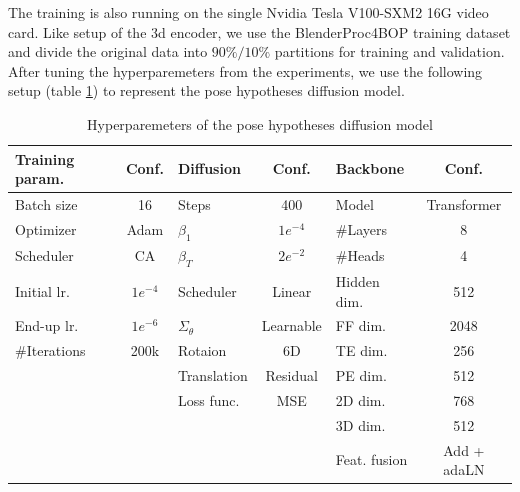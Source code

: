 \documentclass[12pt,DIV14,BCOR12mm,a4paper,footinclude=false,headinclude,parskip=half-,twoside,openright,cleardoublepage=empty,toc=index,bibliography=totoc,listof=totoc]{scrreprt}
\numberwithin{equation}{chapter}
\begin{document}
The training is also running on the single Nvidia Tesla V100-SXM2 16G video card. Like setup of the \gls{3d} encoder, we use the BlenderProc4BOP training dataset and divide the original data into $90\%/10\%$ partitions for training and validation. After tuning the hyperparemeters from the experiments, we use the following setup (table \ref{tab:hyper}) to represent the pose hypotheses diffusion model.
\begin{table}[h]
  \centering
  \caption{Hyperparemeters of the pose hypotheses diffusion model}
  \label{tab:hyper}
  \begin{tabular}{l c | l c | l c}
      \toprule
      Training param. & Conf. & Diffusion & Conf. & Backbone & Conf.\\
      \midrule
      Batch size & 16 & Steps & 400 & Model & Transformer\\
      Optimizer & Adam & $\beta_{1}$ & $1e^{-4}$ & \#Layers & 8\\
      Scheduler & CA & $\beta_{T}$ & $2e^{-2}$ & \#Heads & 4\\
      Initial lr. & $1e^{-4}$ & Scheduler & Linear & Hidden dim. & 512\\
      End-up lr. & $1e^{-6}$ & $\Sigma_{\theta}$ & Learnable & FF dim. & 2048\\
      \#Iterations & 200k & Rotaion & 6D & TE dim. & 256\\
       &  & Translation & Residual & PE dim. & 512\\
       &  & Loss func. & MSE & 2D dim. & 768\\
       &  & & & 3D dim. & 512\\
       &  & & & Feat. fusion & Add + adaLN\\
      \bottomrule
  \end{tabular}
\end{table}
\end{document}
